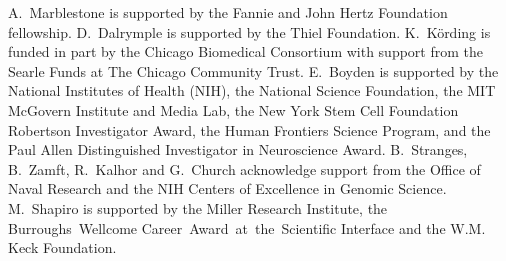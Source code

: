 A.~Marblestone is supported by the Fannie and John Hertz Foundation fellowship.
D.~Dalrymple is supported by the Thiel Foundation.
K.~K\"ording is funded in part by the Chicago Biomedical Consortium with support from the Searle Funds at The Chicago Community Trust.
E.~Boyden is supported by the National Institutes of Health (NIH), the National Science Foundation, the MIT
McGovern Institute and Media Lab, the New York Stem Cell Foundation Robertson Investigator
Award, the Human Frontiers Science Program, and the Paul Allen Distinguished Investigator in
Neuroscience Award.
B.~Stranges, B.~Zamft, R.~Kalhor and G.~Church acknowledge support from the Office of Naval Research and the NIH Centers of Excellence in Genomic Science.
M.~Shapiro is supported by the Miller Research Institute, the Burroughs~Wellcome Career~Award~at~the~Scientific Interface and the W.M. Keck Foundation.

\printbibliography[notsubtype=hide]

